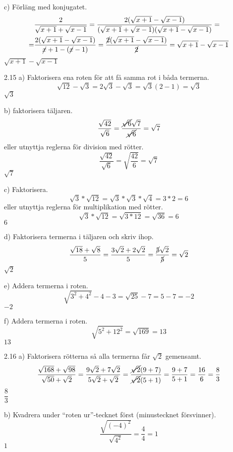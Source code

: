 \begin{task}{c)}
	Förläng med konjugatet.
	\begin{align*}
	&\dfrac{2}{\sqrt{x+1}+\sqrt{x-1}}=
	\dfrac{2(\sqrt{x+1}-\sqrt{x-1})}{(\sqrt{x+1}+\sqrt{x-1})(\sqrt{x+1}-\sqrt{x-1})}= \\ =
	&\dfrac{2(\sqrt{x+1}-\sqrt{x-1})}{\cancel{x}+1-(\cancel{x}-1)}=
	\dfrac{\cancel{2}(\sqrt{x+1}-\sqrt{x-1})}{\cancel{2}}=
	\sqrt{x+1}-\sqrt{x-1}
	\end{align*}
	\ans $\sqrt{x+1}-\sqrt{x-1}$
\end{task}

\begin{task}{2.15 a)}
	Faktorisera ena roten för att få samma rot i båda termerna.
	\[\sqrt{12}-\sqrt{3}=
	2\sqrt{3}-\sqrt{3}=
	\sqrt{3}(2-1)=
	\sqrt{3}\]
	\ans $\sqrt{3}$
\end{task}

\begin{task}{b)}
	faktorisera täljaren.
	\[\dfrac{\sqrt{42}}{\sqrt{6}}=
	\dfrac{\cancel{\sqrt{6}}\sqrt{7}}{\cancel{\sqrt{6}}}=
	\sqrt{7}\]
	eller utnyttja reglerna för division med rötter.
	\[\dfrac{\sqrt{42}}{\sqrt{6}}=\sqrt{\dfrac{42}{6}}=\sqrt{7}\]
	\ans $\sqrt{7}$
\end{task}

\begin{task}{c)}
	Faktorisera.
	\[\sqrt{3}*\sqrt{12}=
	\sqrt{3}*\sqrt{3}*\sqrt{4}=
	3*2=6\]
	eller utnyttja reglerna för multiplikation med rötter.
	\[\sqrt{3}*\sqrt{12}=
	\sqrt{3*12}=
	\sqrt{36}=
	6\]
	\ans $6$
\end{task}

\begin{task}{d)}
	Faktorisera termerna i täljaren och skriv ihop.
	\[\dfrac{\sqrt{18}+\sqrt{8}}{5}=
	\dfrac{3\sqrt{2}+2\sqrt{2}}{5}=
	\dfrac{\cancel{5}\sqrt{2}}{\cancel{5}}=
	\sqrt{2}\]
	\ans $\sqrt{2}$
\end{task}

\begin{task}{e)}
	Addera termerna i roten.
	\[\sqrt{3^2+4^2}-4-3=
	\sqrt{25}-7=
	5-7=
	-2\]
	\ans $-2$
\end{task}

\begin{task}{f)}
	Addera termerna i roten.
	\[\sqrt{5^2+12^2}=\sqrt{169}=13\]
	\ans $13$
\end{task}

\begin{task}{2.16 a)}
	Faktorisera rötterna så alla termerna får $\sqrt{2}$ gemensamt.
	\[\dfrac{\sqrt{168}+\sqrt{98}}{\sqrt{50}+\sqrt{2}}=
	\dfrac{9\sqrt{2}+7\sqrt{2}}{5\sqrt{2}+\sqrt{2}}=
	\dfrac{\cancel{\sqrt{2}}(9+7)}{\cancel{\sqrt{2}}(5+1)}=
	\dfrac{9+7}{5+1}=
	\dfrac{16}{6}=
	\dfrac{8}{3}\]
	\ans $\dfrac{8}{3}$
\end{task}

\begin{task}{b)}
	Kvadrera under ``roten ur''-tecknet först (minustecknet försvinner). 
	\[\dfrac{\sqrt{(-4)^2}}{\sqrt{4^2}}=
	\dfrac{4}{4}=
	1\]
	\ans $1$
\end{task}
